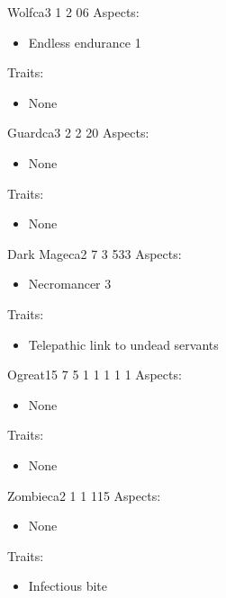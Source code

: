 \documentclass[11pt]{article}
\begin{document}
{\begin{npc}{Wolf}{ca}{3 1 2 0}{6}
Aspects:
\begin{itemize}
\item Endless endurance 1
\end{itemize}
Traits:
\begin{itemize}
\item None
\end{itemize}
\end{npc}

\begin{npc}{Guard}{ca}{3 2 2 2}{0}
Aspects:
\begin{itemize}
\item None
\end{itemize}
Traits:
\begin{itemize}
\item None
\end{itemize}
\end{npc}

\begin{npc}{Dark Mage}{ca}{2 7 3 5}{33}
Aspects:
\begin{itemize}
\item Necromancer 3
\end{itemize}
\columnbreak
Traits:
\begin{itemize}
\item Telepathic link to undead servants
\end{itemize}
\end{npc}

\begin{npc}{Ogre}{at}{15 7 5 1 1 1 1 1}{}
Aspects:
\begin{itemize}
\item None
\end{itemize}
Traits:
\begin{itemize}
\item None
\end{itemize}
\end{npc}

\begin{npc}{Zombie}{ca}{2 1 1 1}{15}
Aspects:
\begin{itemize}
\item None
\end{itemize}
Traits:
\begin{itemize}
\item Infectious bite
\end{itemize}
\end{npc}

}
\end{document}
